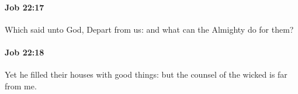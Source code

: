 		\paragraph{Job 22:17} %
			\label{JOB-22-17}

			Which said unto God, Depart from us: and what can the Almighty do for them?


		\paragraph{Job 22:18} %
			\label{JOB-22-18}

			Yet he filled their houses with good things: but the counsel of the wicked is far from me.


